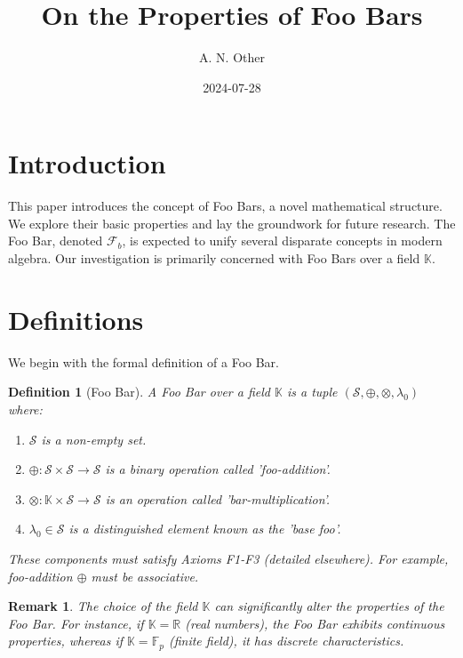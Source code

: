 \documentclass{article}
\title{On the Properties of Foo Bars}
\author{A. N. Other}
\date{2024-07-28}
\newtheorem{definition}[theorem]{Definition}
\newtheorem{remark}[theorem]{Remark}
\begin{document}
\maketitle

\section{Introduction}

This paper introduces the concept of Foo Bars, a novel mathematical structure. We explore their basic properties and lay the groundwork for future research. The Foo Bar, denoted $\mathcal{F}_b$, is expected to unify several disparate concepts in modern algebra. Our investigation is primarily concerned with Foo Bars over a field $\mathbb{K}$.

\section{Definitions}

We begin with the formal definition of a Foo Bar.

\begin{definition}[Foo Bar]
\label{def:foobar}
A \textit{Foo Bar} over a field $\mathbb{K}$ is a tuple $(\mathcal{S}, \oplus, \otimes, \lambda_0)$ where:
\begin{enumerate}
    \item $\mathcal{S}$ is a non-empty set.
    \item $\oplus: \mathcal{S} \times \mathcal{S} \to \mathcal{S}$ is a binary operation called 'foo-addition'.
    \item $\otimes: \mathbb{K} \times \mathcal{S} \to \mathcal{S}$ is an operation called 'bar-multiplication'.
    \item $\lambda_0 \in \mathcal{S}$ is a distinguished element known as the 'base foo'.
\end{enumerate}
These components must satisfy Axioms F1-F3 (detailed elsewhere). For example, foo-addition $\oplus$ must be associative.
\end{definition}

\begin{remark}
\label{rem:fieldchoice}
The choice of the field $\mathbb{K}$ can significantly alter the properties of the Foo Bar. For instance, if $\mathbb{K} = \mathbb{R}$ (real numbers), the Foo Bar exhibits continuous properties, whereas if $\mathbb{K} = \mathbb{F}_p$ (finite field), it has discrete characteristics.
\end{remark}
\end{document}
